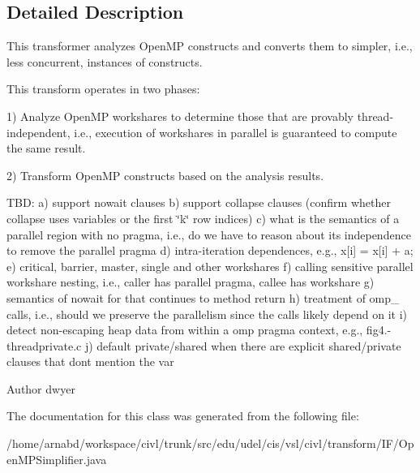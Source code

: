 \subsection{Detailed Description}
This transformer analyzes Open\+M\+P constructs and converts them to simpler, i.\+e., less concurrent, instances of constructs. 

This transform operates in two phases\+:

1) Analyze Open\+M\+P workshares to determine those that are provably thread-\/independent, i.\+e., execution of workshares in parallel is guaranteed to compute the same result.

2) Transform Open\+M\+P constructs based on the analysis results.

T\+B\+D\+: a) support nowait clauses b) support collapse clauses (confirm whether collapse uses variables or the first \char`\"{}k\char`\"{} row indices) c) what is the semantics of a parallel region with no pragma, i.\+e., do we have to reason about its independence to remove the parallel pragma d) intra-\/iteration dependences, e.\+g., x\mbox{[}i\mbox{]} = x\mbox{[}i\mbox{]} + a; e) critical, barrier, master, single and other workshares f) calling sensitive parallel workshare nesting, i.\+e., caller has parallel pragma, callee has workshare g) semantics of nowait for that continues to method return h) treatment of omp\+\_\+ calls, i.\+e., should we preserve the parallelism since the calls likely depend on it i) detect non-\/escaping heap data from within a omp pragma context, e.\+g., fig4.-\/threadprivate.\+c j) default private/shared when there are explicit shared/private clauses that don\textquotesingle{}t mention the var

\begin{DoxyAuthor}{Author}
dwyer 
\end{DoxyAuthor}


The documentation for this class was generated from the following file\+:\begin{DoxyCompactItemize}
\item 
/home/arnabd/workspace/civl/trunk/src/edu/udel/cis/vsl/civl/transform/\+I\+F/Open\+M\+P\+Simplifier.\+java\end{DoxyCompactItemize}
